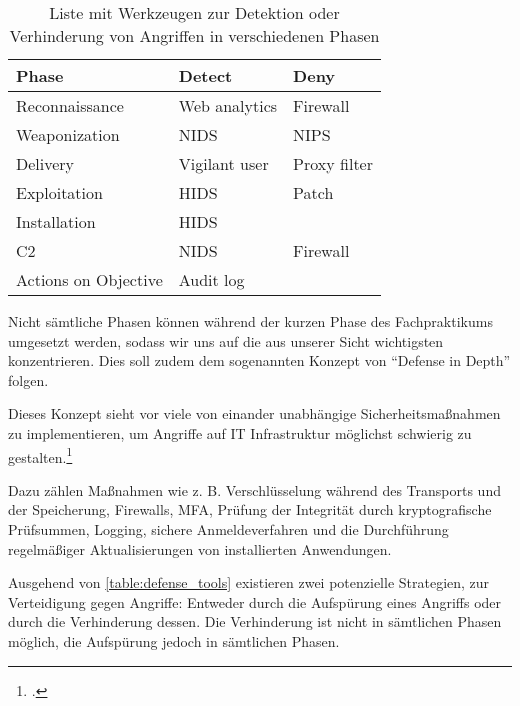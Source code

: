 \begin{table}[]
    \begin{center}
        \begin{tabular}{|l|l|l|}
            \hline
            Phase                & Detect        & Deny         \\ \hline
            Reconnaissance       & Web analytics & Firewall     \\ \hline
            Weaponization        & NIDS          & NIPS         \\ \hline
            Delivery             & Vigilant user & Proxy filter \\ \hline
            Exploitation         & HIDS          & Patch        \\ \hline
            Installation         & HIDS          &              \\ \hline
            C2                   & NIDS          & Firewall     \\ \hline
    Actions on Objective & Audit log     &              \\ \hline
        \end{tabular}
    \caption{Liste mit Werkzeugen zur Detektion oder Verhinderung von Angriffen in verschiedenen Phasen}
    \label{table:defense_tools}
    \end{center}
\end{table}


Nicht sämtliche Phasen können während der kurzen Phase des Fachpraktikums umgesetzt werden, sodass wir uns auf die aus unserer Sicht wichtigsten konzentrieren. Dies soll zudem dem sogenannten Konzept von \enquote{Defense in Depth} folgen.

Dieses Konzept sieht vor viele von einander unabhängige Sicherheitsmaßnahmen zu implementieren, um Angriffe auf IT Infrastruktur möglichst schwierig zu gestalten.\footcite[Vgl.][]{barbu2015defense}

Dazu zählen Maßnahmen wie z. B. Verschlüsselung während des Transports und der Speicherung, Firewalls, \ac{MFA}, Prüfung der Integrität durch kryptografische Prüfsummen, Logging, sichere Anmeldeverfahren und die Durchführung regelmäßiger Aktualisierungen von installierten Anwendungen.

Ausgehend von \autoref{table:defense_tools} existieren zwei potenzielle Strategien, zur Verteidigung gegen Angriffe: Entweder durch die Aufspürung eines Angriffs oder durch die Verhinderung dessen. Die Verhinderung ist nicht in sämtlichen Phasen möglich, die Aufspürung jedoch in sämtlichen Phasen.

